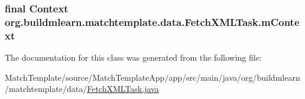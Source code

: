 \subsubsection[{\texorpdfstring{m\+Context}{mContext}}]{\setlength{\rightskip}{0pt plus 5cm}final Context org.\+buildmlearn.\+matchtemplate.\+data.\+Fetch\+X\+M\+L\+Task.\+m\+Context\hspace{0.3cm}{\ttfamily [private]}}\hypertarget{classorg_1_1buildmlearn_1_1matchtemplate_1_1data_1_1FetchXMLTask_a57346838cb912846315ee7398274c6bf}{}\label{classorg_1_1buildmlearn_1_1matchtemplate_1_1data_1_1FetchXMLTask_a57346838cb912846315ee7398274c6bf}


The documentation for this class was generated from the following file\+:\begin{DoxyCompactItemize}
\item 
Match\+Template/source/\+Match\+Template\+App/app/src/main/java/org/buildmlearn/matchtemplate/data/\hyperlink{MatchTemplate_2source_2MatchTemplateApp_2app_2src_2main_2java_2org_2buildmlearn_2matchtemplate_2data_2FetchXMLTask_8java}{Fetch\+X\+M\+L\+Task.\+java}\end{DoxyCompactItemize}
